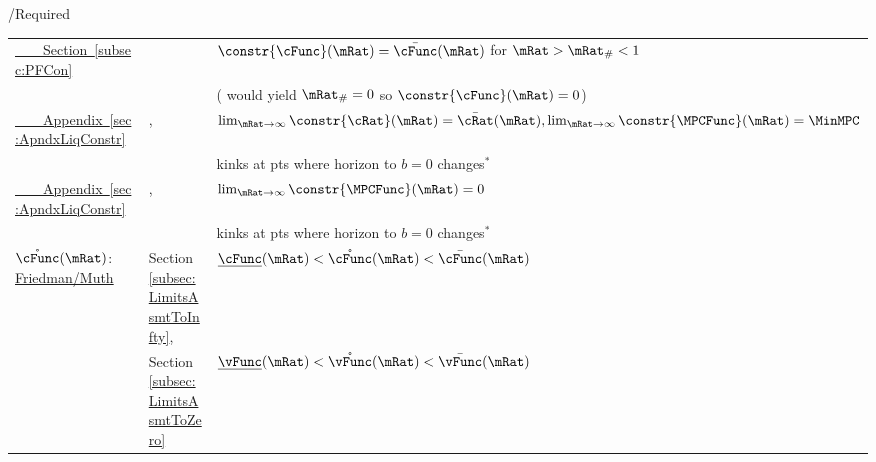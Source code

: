 \documentclass[\econtexRoot/BufferStockTheory]{subfiles}
\begin{document}
\begin{verbatimwrite}{\TableDir/Required}
\begin{table}
{\begin{tabular}{|l|l|l|}
  \\
\href{https://\owner.github.io/BufferStockTheory\#PF-Constrained-Solution}{~~~~Section~\ref{subsec:PFCon}}                                             & & $\constr{\cFunc}(\mRat)=\bar{\cFunc}(\mRat)$ for $\mRat > \mRat_{\#} < 1$
\\  & & (\cncl{\RIC} would yield $\mRat_{\#}=0$ so $\constr{\cFunc}(\mRat)=0$)
  \\ \cline{2-3} \href{https://\owner.github.io/BufferStockTheory\#ApndxLiqConstr}{~~~~Appendix~\ref{sec:ApndxLiqConstr}} & \GICRaw,\RIC & $\lim_{\mRat \rightarrow \infty} \constr{\cRat}(\mRat)=\bar{\cRat}(\mRat), \lim_{\mRat \rightarrow \infty} \constr{\MPCFunc}(\mRat)=\MinMPC$ 
\\                                           &                                 & kinks at pts where horizon to $b=0$ changes$^{\ast}$
  \\ \cline{2-3}\href{https://\owner.github.io/BufferStockTheory\#ApndxLiqConstr}{~~~~Appendix~\ref{sec:ApndxLiqConstr}}                              &   \GICRaw,\cncl{\RIC}    & $\lim_{\mRat \rightarrow \infty}  \constr{\MPCFunc}(\mRat)=0$
\\                                          &                                 & kinks at pts where horizon to $b=0$ changes$^{\ast}$
  \\ \hline\hline \multicolumn{1}{|l|}{$\mathring{\cFunc}(\mRat)$:  \href{https://\owner.github.io/BufferStockTheory\#Uncertainty-Modified-Conditions}{Friedman/Muth}
  } & Section~\ref{subsec:LimitsAsmtToInfty},                     & $\underline{\cFunc}(\mRat) < \mathring{\cFunc}(\mRat) < \bar{\cFunc}(\mRat)$ %
  \\  & Section~\ref{subsec:LimitsAsmtToZero}              & $\underline{\vFunc}(\mRat) < \mathring{\vFunc}(\mRat) < \bar{\vFunc}(\mRat)$ %
                                                                                  

\end{tabular}}
\end{table}
\end{verbatimwrite}
\end{document}
